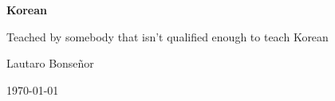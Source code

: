 \begin{titlepage}
    \centering
    \vspace*{2cm}
    {\Huge\bfseries Korean\par}
    {Teached by somebody that isn't qualified enough to teach Korean}\\
    \vspace{1.5cm}
    {\Large Lautaro Bonseñor\par}
    \vfill
    {\large \today\par}
\end{titlepage}